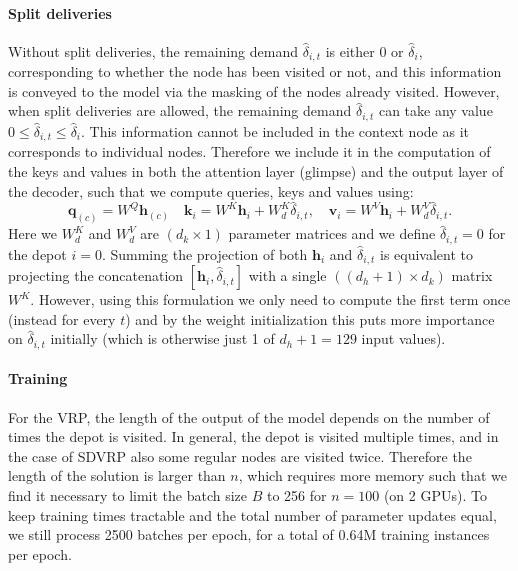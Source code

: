 \paragraph{Split deliveries}
Without split deliveries, the remaining demand $\hat{\delta}_{i,t}$ is either 0 or $\hat{\delta}_i$, corresponding to whether the node has been visited or not, and this information is conveyed to the model via the masking of the nodes already visited. However, when split deliveries are allowed, the remaining demand $\hat{\delta}_{i,t}$ can take any value $0 \le \hat{\delta}_{i,t} \le \hat{\delta}_i$. This information cannot be included in the context node as it corresponds to individual nodes. Therefore we include it in the computation of the keys and values in both the attention layer (glimpse) and the output layer of the decoder, such that we compute queries, keys and values using:
\begin{equation}
\label{eq:dec_qkv_vrp}
	\mathbf{q}_{(c)} = W^Q \mathbf{h}_{(c)} \quad \mathbf{k}_i = W^K \mathbf{h}_i + W_d^K \hat{\delta}_{i,t}, \quad \mathbf{v}_i = W^V \mathbf{h}_i + W_d^V \hat{\delta}_{i,t}.
\end{equation}
Here we $W_d^K$ and $W_d^V$ are $(d_k \times 1)$ parameter matrices and we define $\hat{\delta}_{i,t} = 0$ for the depot $i=0$. Summing the projection of both $\mathbf{h}_i$ and $\hat{\delta}_{i,t}$ is equivalent to projecting the concatenation $[\mathbf{h}_i, \hat{\delta}_{i,t}]$ with a single $((d_h + 1) \times d_k)$ matrix $W^K$. However, using this formulation we only need to compute the first term once (instead for every $t$) and by the weight initialization this puts more importance on $\hat{\delta}_{i,t}$ initially (which is otherwise just 1 of $d_h + 1 = 129$ input values).

\paragraph{Training}
For the VRP, the length of the output of the model depends on the number of times the depot is visited. In general, the depot is visited multiple times, and in the case of SDVRP also some regular nodes are visited twice. Therefore the length of the solution is larger than $n$, which requires more memory such that we find it necessary to limit the batch size $B$ to 256 for $n = 100$ (on 2 GPUs). To keep training times tractable and the total number of parameter updates equal, we still process 2500 batches per epoch, for a total of 0.64M training instances per epoch.


